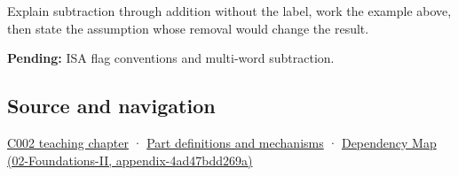 Explain subtraction through addition without the label, work the example above, then state the assumption whose removal would change the result.

\textbf{Pending:} ISA flag conventions and multi-word subtraction.

\subsection{Source and navigation}\label{appendix-1c7df340573e-source-and-navigation}

\hyperref[01-foundations-i-ch001-arithmetic-becomes-a-policy]{C002 teaching chapter} · \hyperref[appendix-fd090d982a15]{Part definitions and mechanisms} · \href{../02-Foundations-II/main.pdf\#nameddest=appendix-4ad47bdd269a}{Dependency Map (02-Foundations-II, appendix-4ad47bdd269a)}
